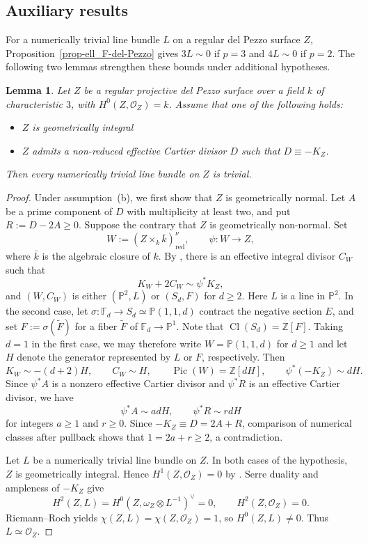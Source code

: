 \documentclass[10pt,abstract=true]{scrartcl}
\numberwithin{equation}{section}
\newtheorem{lemma}[theorem]{Lemma}
\theoremstyle{definition}
\theoremstyle{remark}
\DeclareMathOperator\Pic{Pic}
\begin{document}
\subsection{Auxiliary results}\label{sec:caseC-auxiliary}
For a numerically trivial line bundle $L$ on a regular del Pezzo surface $Z$, Proposition~\ref{prop-ell_F-del-Pezzo} gives $3L\sim0$ if $p=3$ and $4L\sim0$ if $p=2$.
The following two lemmas strengthen these bounds under additional hypotheses.

\begin{lemma}\label{lemm:del-Pezzo-p3}
  Let $Z$ be a regular projective del Pezzo surface over a field $k$ of characteristic $3$, with $H^0(Z,\mathcal O_Z) = k$.
  Assume that one of the following holds:
  \begin{itemize}
    \item[\textup{(a)}] $Z$ is geometrically integral
    \item[\textup{(b)}] $Z$ admits a non-reduced effective Cartier divisor $D$ such that $D\equiv-K_Z$.
  \end{itemize}
  Then every numerically trivial line bundle on $Z$ is trivial.
\end{lemma}
\begin{proof}
  Under assumption~(b), we first show that $Z$ is geometrically normal.
  Let $A$ be a prime component of $D$ with multiplicity at least two, and put $R:=D-2A\geq0$.
  Suppose the contrary that $Z$ is geometrically non-normal.
  Set
  \[
    W := (Z\times_k\overline{k})_{\mathrm{red}}^\nu,
    \qquad \psi\colon W\to Z,
  \]
  where $\bar k$ is the algebraic closure of $k$.
  By \cite[Theorem~4.1]{Patakfalvi-Waldron-2022}, there is an effective integral divisor $C_W$ such that
  \[
    K_W + 2C_W \sim \psi^*K_Z,
  \]
  and $(W,C_W)$ is either $(\mathbb P^2,L)$ or $(S_d,F)$ for $d\geq2$.
  Here $L$ is a line in $\mathbb P^2$.
  In the second case, let $\sigma\colon\mathbb F_d\to S_d\simeq\mathbb P(1,1,d)$ contract the negative section $E$, and set $F:=\sigma(\widetilde F)$ for a fiber $\widetilde F$ of $\mathbb F_d\to\mathbb P^1$.
  Note that $\operatorname{Cl}(S_d)=\mathbb Z[F]$.
  Taking $d=1$ in the first case, we may therefore write $W=\mathbb P(1,1,d)$ for $d\geq1$ and let $H$ denote the generator represented by $L$ or $F$, respectively.
  Then
  \[
    K_W \sim -(d+2)H,\qquad C_W \sim H,\qquad
    \Pic(W) = \mathbb Z[dH],\qquad \psi^*(-K_Z) \sim dH.
  \]
  Since $\psi^*A$ is a nonzero effective Cartier divisor and $\psi^*R$ is an effective Cartier divisor, we have
  \[
    \psi^*A \sim adH,\qquad \psi^*R \sim rdH
  \]
  for integers $a\geq1$ and $r\geq0$.
  Since $-K_Z\equiv D=2A+R$, comparison of numerical classes after pullback shows that $1=2a+r\geq2$, a contradiction.

  Let $L$ be a numerically trivial line bundle on $Z$.
  In both cases of the hypothesis, $Z$ is geometrically integral.
  Hence $H^1(Z,\mathcal O_Z)=0$ by \cite[Proposition~4.10]{Bernasconi-Martin-2024-Bounding}.
  Serre duality and ampleness of $-K_Z$ give
  \[
    H^2(Z,L) = H^0(Z,\omega_Z\otimes L^{-1})^\vee = 0,
    \qquad H^2(Z,\mathcal O_Z)=0.
  \]
  Riemann--Roch yields $\chi(Z,L)=\chi(Z,\mathcal O_Z)=1$, so $H^0(Z,L)\neq0$.
  Thus $L\simeq\mathcal O_Z$.
\end{proof}
\end{document}
